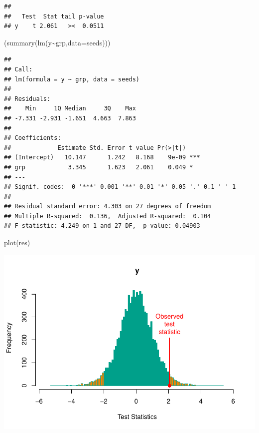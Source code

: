 \documentclass[
]{article}
\newenvironment{Shaded}{\begin{snugshade}}{\end{snugshade}}
\newcommand{\AttributeTok}[1]{\textcolor[rgb]{0.77,0.63,0.00}{#1}}
\newcommand{\FunctionTok}[1]{\textcolor[rgb]{0.00,0.00,0.00}{#1}}
\newcommand{\NormalTok}[1]{#1}
\newcommand{\SpecialCharTok}[1]{\textcolor[rgb]{0.00,0.00,0.00}{#1}}
\begin{document}
\begin{verbatim}
## 
##   Test  Stat tail p-value
## y    t 2.061   ><  0.0511
\end{verbatim}

\begin{Shaded}
\begin{Highlighting}[]
\NormalTok{(}\FunctionTok{summary}\NormalTok{(}\FunctionTok{lm}\NormalTok{(y}\SpecialCharTok{\textasciitilde{}}\NormalTok{grp,}\AttributeTok{data=}\NormalTok{seeds)))}
\end{Highlighting}
\end{Shaded}

\begin{verbatim}
## 
## Call:
## lm(formula = y ~ grp, data = seeds)
## 
## Residuals:
##    Min     1Q Median     3Q    Max 
## -7.331 -2.931 -1.651  4.663  7.863 
## 
## Coefficients:
##             Estimate Std. Error t value Pr(>|t|)    
## (Intercept)   10.147      1.242   8.168    9e-09 ***
## grp            3.345      1.623   2.061    0.049 *  
## ---
## Signif. codes:  0 '***' 0.001 '**' 0.01 '*' 0.05 '.' 0.1 ' ' 1
## 
## Residual standard error: 4.303 on 27 degrees of freedom
## Multiple R-squared:  0.136,  Adjusted R-squared:  0.104 
## F-statistic: 4.249 on 1 and 27 DF,  p-value: 0.04903
\end{verbatim}

\begin{Shaded}
\begin{Highlighting}[]
\FunctionTok{plot}\NormalTok{(res)}
\end{Highlighting}
\end{Shaded}

\begin{center}\includegraphics{perm_files/figure-latex/unnamed-chunk-23-1} \end{center}
\end{document}

